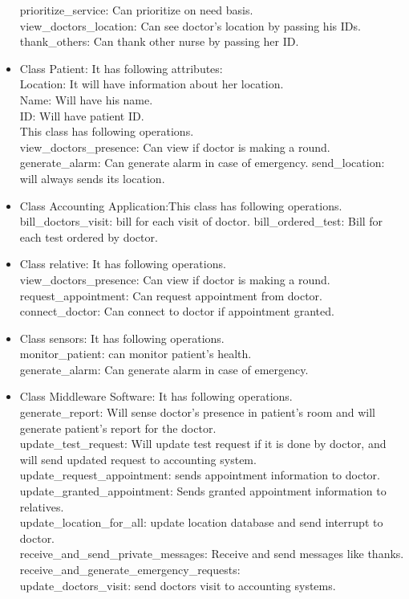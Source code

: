 \documentclass[a4paper,10pt]{report} %
\begin{document}
\begin{itemize}
prioritize\_service: Can prioritize on need basis.\\
view\_doctors\_location: Can see doctor's location by passing his IDs.\\
thank\_others: Can thank other nurse by passing her ID.\\
\item Class Patient: It has following attributes: \\
Location: It will have information about her location. \\
Name: Will have his name.\\
ID: Will have patient ID.\\
This class has following operations. \\
view\_doctors\_presence: Can view if doctor is making a round.
generate\_alarm: Can generate alarm in case of emergency.
send\_location: will always sends its location.\\
\item Class Accounting Application:This class has following operations. \\
bill\_doctors\_visit: bill for each visit of doctor.
bill\_ordered\_test: Bill for each test ordered by doctor. \\
\item Class relative: It has following operations. \\
view\_doctors\_presence: Can view if doctor is making a round.\\
request\_appointment: Can request appointment from doctor.\\
connect\_doctor: Can connect to doctor if appointment granted. \\
\item Class sensors: It has following operations. \\
monitor\_patient: can monitor patient's health. \\
generate\_alarm: Can generate alarm in case of emergency. \\
\item Class Middleware Software: It has following operations. \\
generate\_report: Will sense doctor's presence in patient's room and
will generate patient's report for the doctor.\\
update\_test\_request: Will update test request if it is done by doctor,
and will send updated request to accounting system.\\
update\_request\_appointment: sends appointment information to doctor.
\\
update\_granted\_appointment: Sends granted appointment information to
relatives. \\
update\_location\_for\_all: update location database and send interrupt
to doctor.\\
receive\_and\_send\_private\_messages: Receive and send messages like
thanks. \\
receive\_and\_generate\_emergency\_requests: \\
update\_doctors\_visit: send doctors visit to accounting systems.


\end{itemize}
\end{document}
